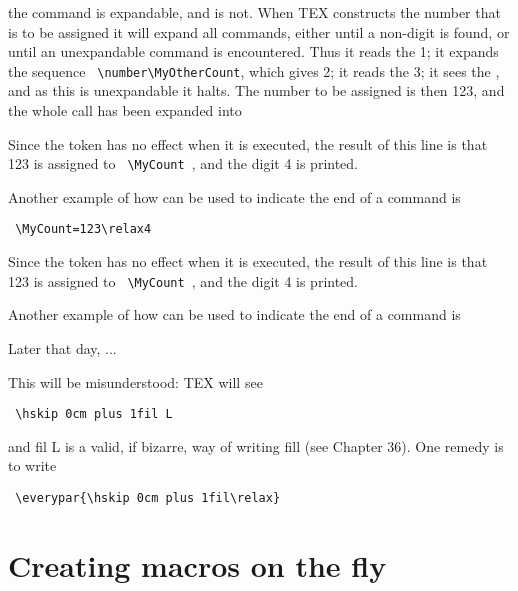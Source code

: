 \begin{multicols}{2}
the command  is expandable, and  is not. When TEX constructs the number that is
to be assigned it will expand all commands, either until a non-digit is found, or until an unexpandable
command is encountered. Thus it reads the 1; it expands the sequence \verb+ \number\MyOtherCount+,
which gives 2; it reads the 3; it sees the , and as this is unexpandable it halts. The number
to be assigned is then 123, and the whole call has been expanded into


\noindent Since the  token has no effect when it is executed, the result of this line is that 123 is
assigned to \verb+ \MyCount +, and the digit 4 is printed.



Another example of how  can be used to indicate the end of a command is

\end{multicols}


\verb+ \MyCount=123\relax4+



\noindent Since the  token has no effect when it is executed, the result of this line is that 123 is
assigned to \verb+ \MyCount +, and the digit 4 is printed.

Another example of how  can be used to indicate the end of a command is


\begin{teX}
\indent Later that day, ...
\end{teX}

\noindent This will be misunderstood: TEX will see

\verb+ \hskip 0cm plus 1fil L+

\noindent and fil L is a valid, if bizarre, way of writing fill (see Chapter 36). One remedy is to write

\verb+ \everypar{\hskip 0cm plus 1fil\relax}+


\section*{Creating macros on the fly}

